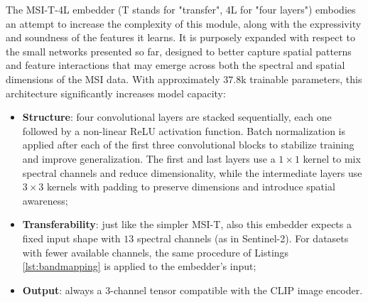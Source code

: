 \documentclass[a4paper, oneside, english]{sapthesis} %
\begin{document}
The MSI-T-4L embedder (T stands for "transfer", 4L for "four layers") embodies an attempt to increase the complexity of this module, along with the expressivity and soundness of the features it learns. It is purposely expanded with respect to the small networks presented so far, designed to better capture spatial patterns and feature interactions that may emerge across both the spectral and spatial dimensions of the MSI data. With approximately $37.8$k trainable parameters, this architecture significantly increases model capacity:

\begin{itemize}
    \item \textbf{Structure}: four convolutional layers are stacked sequentially, each one followed by a non-linear ReLU activation function. Batch normalization is applied after each of the first three convolutional blocks to stabilize training and improve generalization. The first and last layers use a $1\times1$ kernel to mix spectral channels and reduce dimensionality, while the intermediate layers use $3\times3$ kernels with padding to preserve dimensions and introduce spatial awareness;
    \item \textbf{Transferability}: just like the simpler MSI-T, also this embedder expects a fixed input shape with $13$ spectral channels (as in Sentinel-2). For datasets with fewer available channels, the same procedure of Listings \ref{lst:bandmapping} is applied to the embedder's input;
    \item \textbf{Output}: always a $3$-channel tensor compatible with the CLIP image encoder.
\end{itemize}

\vspace{0.5cm}
\end{document}
